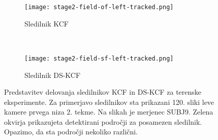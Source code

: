 \begin{figure}[!htb]
	\centering
	\begin{subfigure}{0.45\columnwidth}
		\centering
		\texttt{[image: stage2-field-of-left-tracked.png]}
		\caption{Sledilnik KCF}
	\end{subfigure}
	~
	\begin{subfigure}{0.45\columnwidth}
		\centering
		\texttt{[image: stage2-field-sf-left-tracked.png]}
		\caption{Sledilnik DS-KCF}
	\end{subfigure}
	\caption[Predstavitev delovanja sledilnikov KCF in DS-KCF]{Predstavitev delovanja sledilnikov KCF in DS-KCF za terenske eksperimente. Za primerjavo sledilnikov sta prikazani 120. sliki leve kamere prvega niza 2. tekme. Na slikah je merjenec SUBJ9. Zelena okvirja prikazujeta detektirani področji za posamezen sledilnik. Opazimo, da sta področji nekoliko različni.}
	\label{fig:stage2-field-tracked}
\end{figure}



